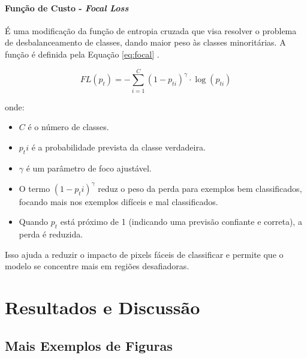 \documentclass[%
  10pt,%
  aspectratio = 169,%
  compress,%
  t,%
  english,%
  brazilian,%
  tikz,
]{beamer}
\begin{document}
\begin{frame}
\framesubtitle{Função de Custo - \textit{Focal Loss}}

É uma modificação da função de entropia cruzada que visa resolver o problema de desbalanceamento de classes, dando maior peso às classes minoritárias. A função é definida pela Equação \ref{eq:focal} \cite{FocalLoss2020}.

\begin{equation}\label{eq:focal}
FL(p_t) = -\sum_{i=1}^{C} (1 - p_{ti})^\gamma \cdot \log(p_{ti})
\end{equation}

\noindent
onde:
\begin{itemize}
    \item \(C\) é o número de classes.
    \item \(p_ti\) é a probabilidade prevista da classe verdadeira.
    \item \(\gamma\) é um parâmetro de foco ajustável.
    \item O termo \((1 - p_ti)^\gamma\) reduz o peso da perda para exemplos bem classificados, focando mais nos exemplos difíceis e mal classificados.
    \item Quando \(p_t\) está próximo de 1 (indicando uma previsão confiante e correta), a perda é reduzida.
\end{itemize}

Isso ajuda a reduzir o impacto de pixels fáceis de classificar e permite que o modelo se concentre mais em regiões desafiadoras.

\end{frame}

\section{Resultados e Discussão}\label{sec:resuldisc}



\subsection{Mais Exemplos de Figuras}\label{ssec:resuldisc1}
\end{document}
